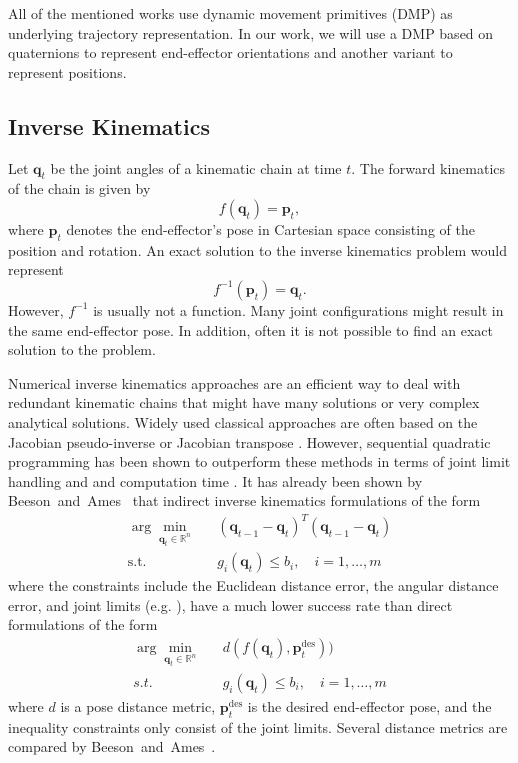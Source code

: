 \documentclass{article}
\begin{document}
All of the mentioned works use
dynamic movement primitives (DMP) as underlying trajectory representation.
In our work, we will use a DMP based on quaternions \cite{Ude2014}
to represent end-effector orientations and another variant \cite{Muelling2013}
to represent positions.

\subsection{Inverse Kinematics}

Let $\boldsymbol{q}_t$ be the joint angles of a kinematic chain at time $t$.
The forward kinematics of the chain is given by
$$f(\boldsymbol{q}_t) = \boldsymbol{p}_t,$$
where $\boldsymbol{p}_t$ denotes the end-effector's pose in Cartesian space
consisting of the position and rotation.
An exact solution to the inverse kinematics problem would represent
$$f^{-1}(\boldsymbol{p}_t) = \boldsymbol{q}_t.$$
However, $f^{-1}$ is usually not a function. Many joint configurations might
result in the same end-effector pose.
In addition, often it is not possible to find an exact solution to the problem.

Numerical inverse kinematics approaches are an efficient way to deal with
redundant kinematic chains that might have many solutions or very complex
analytical solutions.
Widely used classical approaches are often based on the Jacobian pseudo-inverse
or Jacobian transpose \cite{Nilsson2009}. However, sequential quadratic
programming has been shown to outperform these methods in terms of
joint limit handling and and computation time \cite{Beeson2015}.
It has already been shown by Beeson~and~Ames~ that
indirect inverse kinematics formulations of the form
\begin{eqnarray*}
\arg\min_{\boldsymbol{q}_t \in \mathbb{R}^n}&&
  (\boldsymbol{q}_{t-1} - \boldsymbol{q}_t)^T (\boldsymbol{q}_{t-1} - \boldsymbol{q}_t)\\
\text{s.t.} &&
  g_i(\boldsymbol{q}_t) \leq b_i, \quad i = 1, \ldots, m
\end{eqnarray*}
where the constraints include the Euclidean distance error, the angular
distance error, and joint limits (e.g. \cite{Kumar2010,Fallon2015}), have a
much lower success rate than direct formulations of the form
\begin{eqnarray}
\label{ikproblem1}
\arg\min_{\boldsymbol{q}_t \in \mathbb{R}^n}&&
  d(f(\boldsymbol{q}_t), \boldsymbol{p}^{\text{des}}_t))\\
\label{ikproblem2}
s.t. &&
  g_i(\boldsymbol{q}_t) \leq b_i, \quad i = 1, \ldots, m
\end{eqnarray}
where $d$ is a pose distance metric, $\boldsymbol{p}^{\text{des}}_t$
is the desired end-effector pose, and the inequality constraints only
consist of the joint limits. Several distance metrics are compared by
Beeson~and~Ames~.
\end{document}
